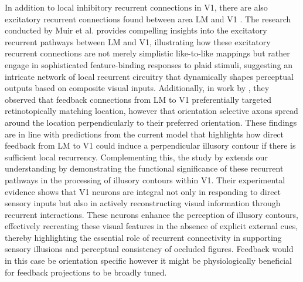 \documentclass[12pt]{article}
\begin{document}
\bigbreak
In addition to local inhibitory recurrent connections in V1, there are also excitatory recurrent connections found between area LM and V1 \autocite{muirSpecificExcitatoryConnectivity2017}. The research conducted by Muir et al. provides compelling insights into the excitatory recurrent pathways between LM and V1, illustrating how these excitatory recurrent connections are not merely simplistic like-to-like mappings but rather engage in sophisticated feature-binding responses to plaid stimuli, suggesting an intricate network of local recurrent circuitry that dynamically shapes perceptual outputs based on composite visual inputs. Additionally, in work by \textcite{marquesFunctionalOrganizationCortical2018}, they observed that feedback connections from LM to V1 preferentially targeted retinotopically matching location, however that orientation selective axons spread around the location perpendicularly to their preferred orientation. These findings are in line with predictions from the current model that highlights how direct feedback from LM to V1 could induce a perpendicular illusory contour if there is sufficient local recurrency. Complementing this, the study by \textcite{shinRecurrentPatternCompletion2023} extends our understanding by demonstrating the functional significance of these recurrent pathways in the processing of illusory contours within V1. Their experimental evidence shows that V1 neurons are integral not only in responding to direct sensory inputs but also in actively reconstructing visual information through recurrent interactions. These neurons enhance the perception of illusory contours, effectively recreating these visual features in the absence of explicit external cues, thereby highlighting the essential role of recurrent connectivity in supporting sensory illusions and perceptual consistency of occluded figures. Feedback would in this case be orientation specific however it might be physiologically beneficial for feedback projections to be broadly tuned.
\end{document}
